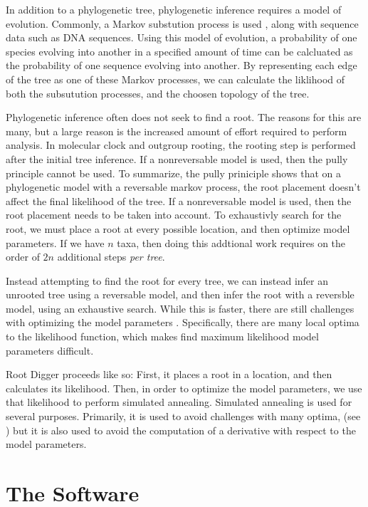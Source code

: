 \documentclass{article}
\begin{document}
In addition to a phylogenetic tree, phylogenetic inference requires a model of
evolution. Commonly, a Markov substution process is used
\cite{yang_computational_2006}, along with sequence data such as DNA sequences.
Using this model of evolution, a probability of one species evolving into
another in a specified amount of time can be calcluated as the probability of
one sequence evolving into another. By representing each edge of the tree as one
of these Markov processes, we can calculate the liklihood of both the
subsutution processes, and the choosen topology of the tree.

Phylogenetic inference often does not seek to find a root. The reasons for this
are many, but a large reason is the increased amount of effort required to
perform analysis. In molecular clock and outgroup rooting, the rooting step is
performed after the initial tree inference. If a nonreversable model is used,
then the pully principle \cite{felsenstein_evolutionary_1981} cannot be used. To
summarize, the pully priniciple shows that on a phylogenetic model with a
reversable markov process, the root placement doesn't affect the final
likelihood of the tree. If a nonreversable model is used, then the root
placement needs to be taken into account. To exhaustivly search for the root, we
must place a root at every possible location, and then optimize model
parameters. If we have $n$ taxa, then doing this addtional work requires on the
order of $2n$ additional steps {\em per tree}.

Instead attempting to find the root for every tree, we can instead infer an
unrooted tree using a reversable model, and then infer the root with a
reversble model, using an exhaustive search. While this is faster, there are
still challenges with optimizing the model parameters
\cite{huelsenbeck_inferring_2002}. Specifically, there are many local optima to
the likelihood function, which makes find maximum likelihood model parameters
difficult.

Root Digger proceeds like so: First, it places a root in a location, and then
calculates its likelihood. Then, in order to optimize the model parameters, we
use that likelihood to perform simulated annealing. Simulated annealing is used
for several purposes. Primarily, it is used to avoid challenges with many
optima, (see \cite{huelsenbeck_inferring_2002}) but it is also used to avoid the
computation of a derivative with respect to the model parameters.

\section{The Software}
\end{document}
